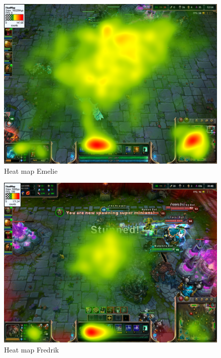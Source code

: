 \documentclass{article}
\begin{document}
\begin{figure}[h!]
\begin{center}
\includegraphics*[width=0.90\columnwidth]{images/heatmap/Emelie}
\end{center}
\caption{Heat map Emelie}
\label{heat_eme}
\end{figure}

\begin{figure}[h!]
\begin{center}
\includegraphics*[width=0.90\columnwidth]{images/heatmap/Fredrik}
\end{center}
\caption{Heat map Fredrik}
\label{heat_fre}
\end{figure}
\end{document}
